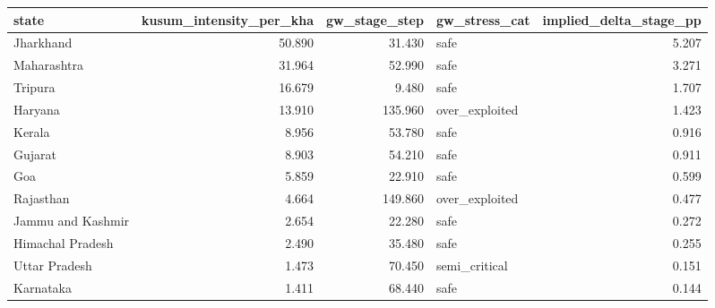 \begin{tabular}{lrrlr}
\toprule
state & kusum_intensity_per_kha & gw_stage_step & gw_stress_cat & implied_delta_stage_pp \\
\midrule
Jharkhand & 50.890 & 31.430 & safe & 5.207 \\
Maharashtra & 31.964 & 52.990 & safe & 3.271 \\
Tripura & 16.679 & 9.480 & safe & 1.707 \\
Haryana & 13.910 & 135.960 & over_exploited & 1.423 \\
Kerala & 8.956 & 53.780 & safe & 0.916 \\
Gujarat & 8.903 & 54.210 & safe & 0.911 \\
Goa & 5.859 & 22.910 & safe & 0.599 \\
Rajasthan & 4.664 & 149.860 & over_exploited & 0.477 \\
Jammu and Kashmir & 2.654 & 22.280 & safe & 0.272 \\
Himachal Pradesh & 2.490 & 35.480 & safe & 0.255 \\
Uttar Pradesh & 1.473 & 70.450 & semi_critical & 0.151 \\
Karnataka & 1.411 & 68.440 & safe & 0.144 \\
\bottomrule
\end{tabular}
